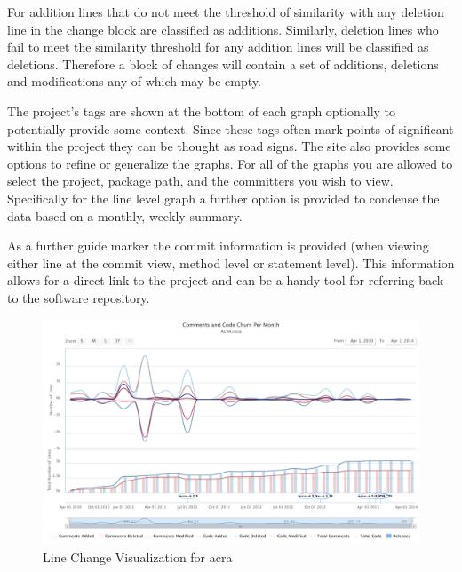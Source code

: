 For addition lines that do not meet the threshold of similarity with any deletion line in the change block are classified as additions. Similarly, deletion lines who fail to meet the similarity threshold for any addition lines will be classified as deletions. Therefore a block of changes will contain a set of additions, deletions and modifications any of which may be empty.



The project's tags are shown at the bottom of each graph optionally to potentially provide some context. Since these tags often mark points of significant within the project they can be thought as road signs. The site also provides some options to refine or generalize the graphs. For all of the graphs you are allowed to select the project, package path, and the committers you wish to view. Specifically for the line level graph a further option is provided to condense the data based on a monthly, weekly summary.

As a further guide marker the commit information is provided (when viewing either line at the commit view, method level or statement level). This information allows for a direct link to the project and can be a handy tool for referring back to the software repository.



\begin{landscape}
 \thispagestyle{empty}
 \begin{figure}
  \centering
        \includegraphics[width=1.5\textwidth]{images/lines_visual_acra}
    \caption{Line Change Visualization for acra}
    \label{fig:line_visual_acra}
 \end{figure}
\end{landscape}
\pagestyle{plain}

